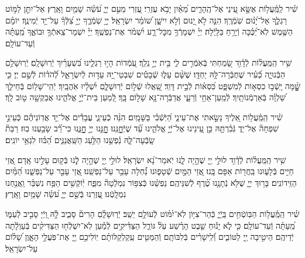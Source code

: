 \documentclass[twoside, openany, parskip=half, 11pt]{book}
\begin{document}
שִׁ֗יר לַֽמַּֽ֫עֲל֥וֹת אֶשָּׂ֣א עֵ֭ינַי אֶל־הֶֽהָרִ֑ים מֵ֝אַ֗יִן יָבֹ֥א עֶזְרִֽי׃ עֶ֭זְרִי מֵעִ֣ם יְיָ֑ עֹ֝שֵׂ֗ה שָׁמַ֥יִם וָאָֽרֶץ׃ אַל־יִתֵּ֣ן לַמּ֣וֹט רַגְלֶ֑ךָ אַל־יָ֝נ֗וּם שֹֽׁמְֿרֶֽךָ׃ הִנֵּ֤ה לֹ֣א יָ֭נוּם וְֿלֹ֣א יִישָׁ֑ן שׁ֝וֹמֵ֗ר יִשְׂרָאֵֽל׃ יְיָ֥ שֹֽׁמְֿרֶ֑ךָ יְיָ֥ צִ֝לְּֿךָ֗ עַל־יַ֥ד יְֿמִינֶֽךָ׃ יוֹמָ֗ם הַשֶּׁ֥מֶשׁ לֹֽא־יַ֝כֶּ֗כָּה וְֿיָרֵ֥חַ בַּלָּֽיְֿלָה׃ יְיָ֗ יִשְׁמָרְֿךָ֥ מִכׇּל־רָ֑ע יִ֝שְׁמֹ֗ר אֶת־נַפְשֶֽׁךָ׃ יְיָ֗ יִשְׁמָר־צֵֽאתְֿךָ֥ וּבוֹאֶ֑ךָ מֵֽ֝עַתָּ֗ה וְֿעַד־עוֹלָֽם׃

שִׁ֥יר הַֽמַּֽעֲל֗וֹת לְֿדָ֫וִ֥ד שָׂ֭מַחְתִּי בְּֿאֹֽמְֿרִ֣ים לִ֑י בֵּ֖ית יְיָ֣ נֵלֵֽךְ׃ עֹֽ֭מְֿדוֹת הָי֣וּ רַגְלֵ֑ינוּ בִּ֝שְׁעָרַ֗יִךְ יְֿרֽוּשָׁלָֽםִ׃ יְֿרֽוּשָׁלַ֥םִ הַבְּֿנוּיָ֑ה כְּֿ֝עִ֗יר שֶׁחֻבְּֿרָה־לָּ֥הּ יַחְדָּֽו׃ שֶׁשָּׁ֨ם עָל֢וּ שְֿׁבָטִ֡ים שִׁבְטֵי־יָ֭הּ עֵד֣וּת לְֿיִשְׂרָאֵ֑ל לְֿ֝הֹד֗וֹת לְֿשֵׁ֣ם יְיָ׃ כִּ֤י שׇׇׇָׁ֨מָּה יָֽשְֿׁב֣וּ כִסְא֣וֹת לְֿמִשְׁפָּ֑ט כִּ֝סְא֗וֹת לְֿבֵ֣ית דָּוִֽד׃ שַֽׁ֭אֲלוּ שְֿׁל֣וֹם יְֿרֽוּשָׁלָ֑םִ יִ֝שְׁלָ֗יוּ אֹֽהֲבָֽיִךְ׃ יְֿהִֽי־שָׁל֥וֹם בְּֿחֵילֵ֑ךְ שַׁ֝לְוָ֗ה בְּֿאַרְמְֿנוֹתָֽיִךְ׃ לְֿמַֽעַן־אַחַ֥י וְֿרֵעָ֑י אֲדַבְּֿרָה־נָּ֖א שָׁל֣וֹם בָּֽךְ׃ לְֿ֭מַעַן בֵּית־יְֿיָ֣ אֱלֹהֵ֑ינוּ אֲבַקְשָׁ֖ה ט֣וֹב לָֽךְ׃

שִׁ֗יר הַֽמַּֽ֫עֲל֥וֹת אֵ֭לֶיךָ נָשָׂ֣אתִי אֶת־עֵינַ֑י הַ֝יֹּֽשְֿׁבִ֗י בַּשָּׁמָֽיִם׃ הִנֵּ֨ה כְֿעֵינֵ֢י עֲבָדִ֡ים אֶל־יַ֤ד אֲדֽוֹנֵיהֶ֗ם כְּֿעֵינֵ֣י שִׁפְחָה֘ אֶל־יַד֢ גְּֿבִ֫רְתָּ֥הּ כֵּ֣ן עֵ֭ינֵינוּ אֶל־יְֿיָ֣ אֱלֹהֵ֑ינוּ עַ֝֗ד שֶׁיְּֿחׇׇׇׇׇָנֵּֽנוּ׃ חׇׇׇׇָנֵּ֣נוּ יְיָ֣ חׇׇׇׇָנֵּ֑נוּ כִּי־רַ֝֗ב שָׂבַ֥עְנוּ בֽוּז׃ רַבַּת֘ שָֽׂבְֿעָה־לָּ֢הּ נַ֫פְשֵׁ֥נוּ הַלַּ֥עַג הַשַּֽׁאֲנַנִּ֑ים הַ֝בּ֗וּז לִגְאֵ֥י יוֹנִֽים׃


שִׁ֥יר הַֽמַּֽעֲל֗וֹת לְֿדָ֫וִ֥ד לוּלֵ֣י יְ֖יָ שֶׁהָ֣יָה לָ֑נוּ יֹֽאמַר־נָ֝א יִשְׂרָאֵֽל׃ לוּלֵ֣י יְ֖יָ שֶׁהָ֣יָה לָֿ֑נוּ בְּֿק֖וּם עָלֵ֣ינוּ אָֽדָם׃ אֲ֭זַי חַיִּ֣ים בְּֿלָע֑וּנוּ בַּֽחֲר֖וֹת אַפָּם בָּֽנוּ׃ אֲ֭זַי הַמַּ֣יִם שְֿׁטָפ֑וּנוּ נַ֝֗חְלָה עָבַ֥ר עַל־נַפְשֵֽׁנוּ׃ אֲ֭זַי עָבַ֣ר עַל־נַפְשֵׁ֑נוּ הַ֝מַּ֗יִם הַזֵּֽידוֹנִֽים׃ בָּר֥וּךְ יְיָ֑ שֶׁלֹּ֖א נְֿתָנָ֥נוּ טֶ֝֗רֶף לְֿשִׁנֵּיהֶֽם׃ נַפְשֵׁ֗נוּ כְּֿצִפּ֥וֹר נִמְלְֿטָה֘ מִפַּ֢ח יֽ֫וֹקְֿשִׁ֥ים הַפַּ֥ח נִשְׁבַּ֗ר וַֽאֲנַ֥חְנוּ נִמְלָֽטְֿנוּ׃ עֶ֭זְרֵנוּ בְּֿשֵׁ֣ם יְיָ֑ עֹ֝שֵׂ֗ה שָׁמַ֥יִם וָאָֽרֶץ׃

שִׁ֗יר הַֽמַּֽ֫עֲל֥וֹת הַבּֽוֹטְֿחִ֥ים בַּֽיְֿיָ֑ כְּֿהַר־צִיּ֥וֹן לֹֽא־יִ֝מּ֗וֹט לְֿעוֹלָ֥ם יֵשֵֽׁב׃ יְֿרְוּשָׁלְַ֗םִ הָרִים֘ סָבִ֢יב לָ֥֫הּ וַ֭יְֿיָ סָבִ֣יב לְֿעַמּ֑וֹ מֵֽ֝עַתָּ֗ה וְֿעַד־עוֹלָֽם׃ כִּ֤י לֹ֢א יָנ֡וּחַ שֵׁ֤בֶט הָרֶ֗שַׁע עַל֘ גּוֹרַ֢ל הַצַּדִּ֫יקִ֥ים לְֿמַ֡עַן לֹֽא־יִשְׁלְֿח֖וּ הַצַּדִּיקִ֨ים בְּֿעַוְלָ֬תָה יְֿדֵיהֶֽם׃ הֵיטִ֣יבָה יְ֖יָ לַטּוֹבִ֑ים וְֿ֝לִֽישָׁרִ֗ים בְּֿלִבּוֹתָֽם׃ וְֿהַמַּטִּ֤ים עַֽקַלְקַלּוֹתָ֗ם יֽוֹלִיכֵ֣ם יְ֖יָ אֶת־פֹּֽעֲלֵ֣י הָאָ֑וֶן שָׁ֝ל֗וֹם עַל־יִשְׂרָאֵֽל׃
\end{document}
